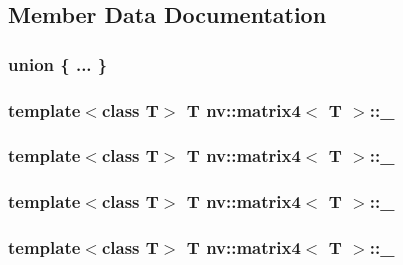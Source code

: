 \subsection{Member Data Documentation}
\hypertarget{classnv_1_1matrix4_f2106b93278534202745ad86773910e8}{
\subsubsection[{"@3}]{\setlength{\rightskip}{0pt plus 5cm}union \{ ... \} }}
\label{classnv_1_1matrix4_f2106b93278534202745ad86773910e8}


\hypertarget{classnv_1_1matrix4_5fbda38eab1e83ec03072c35ce446f23}{
\subsubsection[{\_\-11}]{\setlength{\rightskip}{0pt plus 5cm}template$<$class T$>$ T {\bf nv::matrix4}$<$ T $>$::{\bf \_}}}
\label{classnv_1_1matrix4_5fbda38eab1e83ec03072c35ce446f23}


\hypertarget{classnv_1_1matrix4_2f77d39c6fef6e44fe51f942dbeae1ad}{
\subsubsection[{\_\-12}]{\setlength{\rightskip}{0pt plus 5cm}template$<$class T$>$ T {\bf nv::matrix4}$<$ T $>$::{\bf \_}}}
\label{classnv_1_1matrix4_2f77d39c6fef6e44fe51f942dbeae1ad}


\hypertarget{classnv_1_1matrix4_6b77bf7df000c2da8b10cdfb707496d3}{
\subsubsection[{\_\-13}]{\setlength{\rightskip}{0pt plus 5cm}template$<$class T$>$ T {\bf nv::matrix4}$<$ T $>$::{\bf \_}}}
\label{classnv_1_1matrix4_6b77bf7df000c2da8b10cdfb707496d3}


\hypertarget{classnv_1_1matrix4_2cd5b3fd361e5520b366f499d56bc31f}{
\subsubsection[{\_\-14}]{\setlength{\rightskip}{0pt plus 5cm}template$<$class T$>$ T {\bf nv::matrix4}$<$ T $>$::{\bf \_}}}
\label{classnv_1_1matrix4_2cd5b3fd361e5520b366f499d56bc31f}


